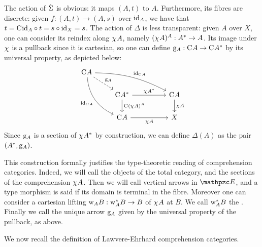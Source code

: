 \documentclass{lmcs} %
\theoremstyle{plain}\newtheorem{satz}[thm]{Satz} %
\begin{document}
			The action of $\dot{\Sigma}$ is obvious: it maps $(A,t)$ to $A$. Furthermore, its fibres are discrete: given $f:(A,t)\to (A,s)$ over $\mathrm{id}_{A}$, we have that $t=\mathrm{C}^{}\mathrm{id}_{A}\circ t= s\circ \mathrm{id}_{X}=s$. The action of $\Delta$ is less transparent: given $A$ over $X$, one can consider its reindex along $\chi^{}A$, namely $(\chi^{}A)^{A}:A^*\to A$. Its image under $\chi^{}$ is a pullback since it is cartesian, so one can define $\mathrm{g}_{A}:\mathrm{C}^{}A\to \mathrm{C}^{}A^*$ by its universal property, as depicted below:
			\[\begin{tikzcd}
				{\comp{}A} \\
				& {\comp{}\reind{A}} && {\comp{}A} \\
				& {\comp{}A} && X
				\arrow["{{\gel{A}}}", dashed, from=1-1, to=2-2]
				\arrow["{{\id{\comp{}A}}}", bend left=3ex, from=1-1, to=2-4]
				\arrow["{{\id{\comp{}A}}}"', bend right, from=1-1, to=3-2]
				\arrow["{{\jcomp{}\reind{A}}}", from=2-2, to=2-4]
				\arrow["{{\comp{}\carar{(\jcomp{}A)}{A}}}", from=2-2, to=3-2]
				\arrow["{{\jcomp{}A}}", from=2-4, to=3-4]
				\arrow["{{\jcomp{}A}}"', from=3-2, to=3-4]
			\end{tikzcd}\]
			Since $\mathrm{g}_{A}$ is a section of $\chi^{}A^*$ by construction, we can define $\Delta(A)$ as the pair $(A^*, \mathrm{g}_{A})$.
		
This construction formally justifies the type-theoretic reading of comprehension categories. 
Indeed, we will call  the objects of the total category, and  the sections of the comprehension $\chi^{}A$. Then we will call  vertical arrows in $\ct{E}$, and a type morphism is said  if its domain is terminal in the fibre.
			Moreover one can consider a cartesian lifting $\mathrm{w}_{A}B:\mathrm{w}_{A}^*B\to B$ of $\chi^{}A$ at $B$. We call $\mathrm{w}_{A}^*B$ the . Finally we call  the unique arrow $\mathrm{g}_{A}$ given by the universal property of the pullback, as above.

We now recall the definition of Lawvere-Ehrhard comprehension categories.
\end{document}
